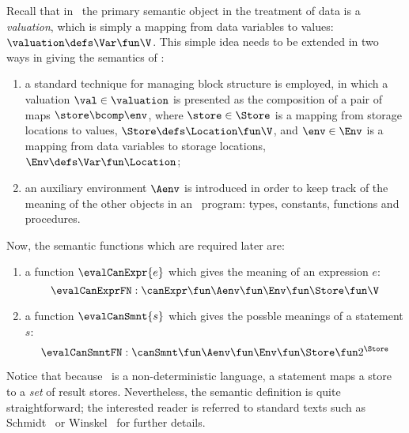 Recall that in \bcandle\ the primary semantic object in the treatment
of data is a \emph{valuation}, which is simply a mapping from data
variables to values: $\valuation \defs \Var \fun \V$. This simple idea
needs to be extended in two ways in giving the semantics of \sdml:
\begin{enumerate}
\item a standard technique for managing block structure is employed,
  in which a valuation $\val \in \valuation$ is presented as the composition
  of a pair of maps $\store \bcomp \env$, where $\store \in \Store$ is
  a mapping from storage locations to values, $\Store \defs \Location
  \fun \V$, and $\env \in \Env$ is a mapping from data variables to
  storage locations, $\Env \defs \Var \fun \Location$;
\item an auxiliary environment $\Aenv$ is introduced in order to
  keep track of the meaning of the other objects in an \sdml\ program:
  types, constants, functions and procedures.
\end{enumerate}

Now, the semantic functions which are required later are:
\begin{enumerate}
\item a function $\evalCanExpr{e}$ which gives the meaning of 
  an expression $e$: 
  \[ \evalCanExprFN: \canExpr \fun \Aenv \fun \Env \fun \Store \fun \V \]
\item a function $\evalCanSmnt{s}$ which gives the possble meanings of a
  statement $s$:
  \[ \evalCanSmntFN: \canSmnt \fun \Aenv \fun \Env \fun \Store 
     \fun 2^\Store \]
\end{enumerate} 
 
Notice that because \sdml\ is a non-deterministic language,
a statement maps a store to a \emph{set} of result stores. 
Nevertheless, the semantic definition is quite straightforward; the interested
reader is referred to standard texts such as Schmidt~\cite{sch:86}
or Winskel~\cite{win:93} for further details.

